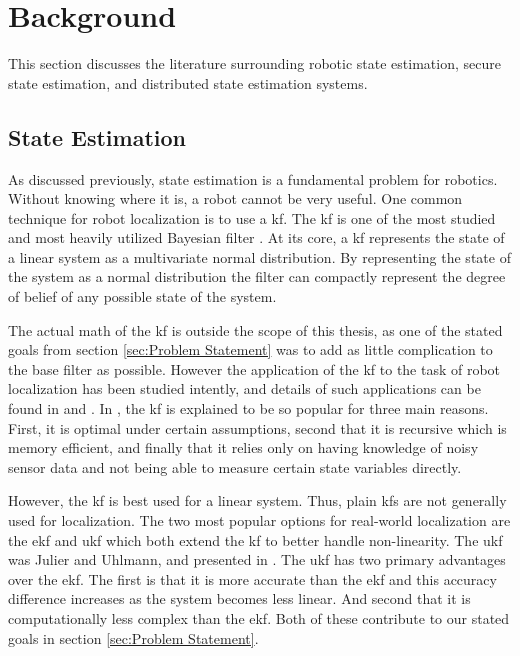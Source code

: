 \documentclass[thesis.tex]{subfile}
\begin{document}
\chapter{Background} \label{Background}
This section discusses the literature surrounding robotic state estimation, secure state estimation, and distributed state estimation systems.

\section{State Estimation}
As discussed previously, state estimation is a fundamental problem for robotics. Without knowing where it is, a robot cannot be very useful. One common technique for robot localization is to use a \gls{kf}. The \gls{kf} is one of the most studied and most heavily utilized Bayesian filter \cite[39-81]{ProbabilisticRobotics}. At its core, a \gls{kf} represents the state of a linear system as a multivariate normal distribution. By representing the state of the system as a normal distribution the filter can compactly represent the degree of belief of any possible state of the system.

The actual math of the \gls{kf} is outside the scope of this thesis, as one of the stated goals from section \ref{sec:Problem Statement} was to add as little complication to the base filter as possible. However the application of the \gls{kf} to the task of robot localization has been studied intently, and details of such applications can be found in \cite{Localization2003} and \cite{Mohsin2014}. In \cite{Mohsin2014}, the \gls{kf} is explained to be so popular for three main reasons. First, it is optimal under certain assumptions, second that it is recursive which is memory efficient, and finally that it relies only on having knowledge of noisy sensor data and not being able to measure certain state variables directly.

However, the \gls{kf} is best used for a linear system. Thus, plain \glspl{kf} are not generally used for localization. The two most popular options for real-world localization are the \gls{ekf} and \gls{ukf} which both extend the \gls{kf} to better handle non-linearity. The \gls{ukf} was Julier and Uhlmann, and presented in \cite{Julier1997}. The \gls{ukf} has two primary advantages over the \gls{ekf}. The first is that it is more accurate than the \gls{ekf} and this accuracy difference increases as the system becomes less linear. And second that it is computationally less complex than the \gls{ekf}. Both of these contribute to our stated goals in section \ref{sec:Problem Statement}.
\end{document}
